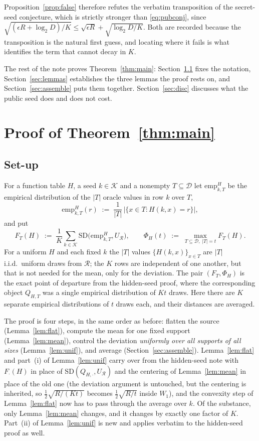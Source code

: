 \documentclass[11pt,a4paper]{article}
\theoremstyle{plain}
\theoremstyle{definition}
\theoremstyle{remark}
\newcommand{\SD}{\mathrm{SD}}
\newcommand{\calK}{\mathcal{K}}
\newcommand{\calD}{\mathcal{D}}
\newcommand{\calR}{\mathcal{R}}
\newcommand{\emp}{\mathrm{emp}}
\begin{document}
Proposition~\ref{prop:false} therefore refutes the verbatim transposition of the secret-seed
conjecture, which is strictly stronger than \eqref{eq:pubconj}, since
$\sqrt{(\epsilon R + \log_2 D)/K} \le \sqrt{\epsilon R} + \sqrt{\log_2 D/K}$. Both are recorded
because the transposition is the natural first guess, and locating where it fails is what
identifies the term that cannot decay in $K$.

The rest of the note proves Theorem~\ref{thm:main}: Section~\ref{sec:setup} fixes the notation,
Section~\ref{sec:lemmas} establishes the three lemmas the proof rests on, and
Section~\ref{sec:assemble} puts them together. Section~\ref{sec:disc} discusses what the public
seed does and does not cost.

\section{Proof of Theorem~\ref{thm:main}}\label{sec:proof}

\subsection{Set-up}\label{sec:setup}

For a function table $H$, a seed $k \in \calK$ and a nonempty $T \subseteq \calD$ let
$\emp^{H}_{k,T}$ be the empirical distribution of the $|T|$ oracle values in row $k$ over $T$,
\[
  \emp^{H}_{k,T}(r) \;:=\; \frac{1}{|T|}\,\bigl|\{x \in T : H(k,x) = r\}\bigr| ,
\]
and put
\[
  F_{T}(H) \;:=\; \frac{1}{K}\sum_{k \in \calK} \SD\bigl(\emp^{H}_{k,T}, U_{\calR}\bigr),
  \qquad
  \Phi_{H}(t) \;:=\; \max_{T \subseteq \calD,\; |T| = t} F_{T}(H) .
\]
For a uniform $H$ and each fixed $k$ the $|T|$ values $\{H(k,x)\}_{x \in T}$ are $|T|$ i.i.d.\
uniform draws from $\calR$; the $K$ rows are independent of one another, but that is not needed for
the mean, only for the deviation. The pair $(F_{T}, \Phi_{H})$ is the exact point of departure from the hidden-seed proof,
where the corresponding object $Q_{H,T}$ was a single empirical distribution of $Kt$ draws. Here
there are $K$ separate empirical distributions of $t$ draws each, and their distances are averaged.

\smallskip
The proof is four steps, in the same order as before: flatten the source (Lemma~\ref{lem:flat}),
compute the mean for one fixed support (Lemma~\ref{lem:mean}), control the deviation \emph{uniformly
over all supports of all sizes} (Lemma~\ref{lem:unif}), and average (Section~\ref{sec:assemble}).
Lemma~\ref{lem:flat} and part~(i) of Lemma~\ref{lem:unif} carry over from the hidden-seed note with
$F_{\cdot}(H)$ in place of $\SD(Q_{H,\cdot},U_{\calR})$ and the centering of
Lemma~\ref{lem:mean} in place of the old one (the deviation argument is untouched, but the
centering is inherited, so $\tfrac12\sqrt{R/(Kt)}$ becomes $\tfrac12\sqrt{R/t}$ inside $W_{1}$),
and the convexity step of Lemma~\ref{lem:flat} now has to pass through the average over $k$. Of the
substance, only Lemma~\ref{lem:mean} changes, and it changes by exactly one factor of $K$.
Part~(ii) of Lemma~\ref{lem:unif} is new and applies verbatim to the hidden-seed proof as well.
\end{document}
